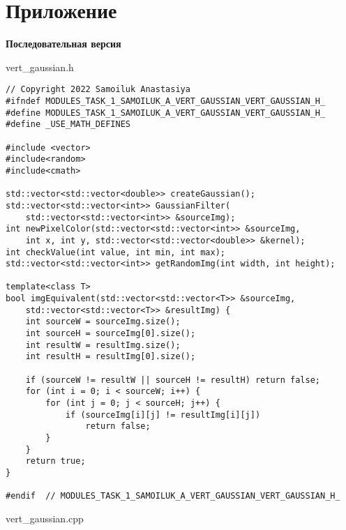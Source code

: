 \documentclass{report}
\begin{document}
\section*{Приложение}
\textbf{Последовательная версия}
\par vert\_gaussian.h
\begin{lstlisting}
// Copyright 2022 Samoiluk Anastasiya
#ifndef MODULES_TASK_1_SAMOILUK_A_VERT_GAUSSIAN_VERT_GAUSSIAN_H_
#define MODULES_TASK_1_SAMOILUK_A_VERT_GAUSSIAN_VERT_GAUSSIAN_H_
#define _USE_MATH_DEFINES

#include <vector>
#include<random>
#include<cmath>

std::vector<std::vector<double>> createGaussian();
std::vector<std::vector<int>> GaussianFilter(
    std::vector<std::vector<int>> &sourceImg);
int newPixelColor(std::vector<std::vector<int>> &sourceImg,
    int x, int y, std::vector<std::vector<double>> &kernel);
int checkValue(int value, int min, int max);
std::vector<std::vector<int>> getRandomImg(int width, int height);

template<class T>
bool imgEquivalent(std::vector<std::vector<T>> &sourceImg,
    std::vector<std::vector<T>> &resultImg) {
    int sourceW = sourceImg.size();
    int sourceH = sourceImg[0].size();
    int resultW = resultImg.size();
    int resultH = resultImg[0].size();

    if (sourceW != resultW || sourceH != resultH) return false;
    for (int i = 0; i < sourceW; i++) {
        for (int j = 0; j < sourceH; j++) {
            if (sourceImg[i][j] != resultImg[i][j])
                return false;
        }
    }
    return true;
}

#endif  // MODULES_TASK_1_SAMOILUK_A_VERT_GAUSSIAN_VERT_GAUSSIAN_H_
\end{lstlisting}
\par vert\_gaussian.cpp
\end{document}
